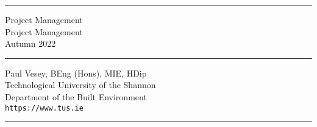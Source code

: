 
\thispagestyle{empty} %


\hrule

\vspace*{0.7cm} %


\begin{flushright}
\Huge Project Management \\
\vspace*{0.7cm}
\Large Project Management\\
Autumn 2022
\end{flushright}

\vspace*{0.7cm} %
	
\normalsize

\hrule


\vfill %


{\centering \large 
\hfill Paul Vesey, \scriptsize BEng (Hons), MIE, HDip\normalsize \\
\hfill Technological University of the Shannon \\
\hfill Department of the Built Environment \\
\hfill \texttt{https://www.tus.ie} \\
\vspace*{0.7cm} 
\hrule} %


\clearpage %
